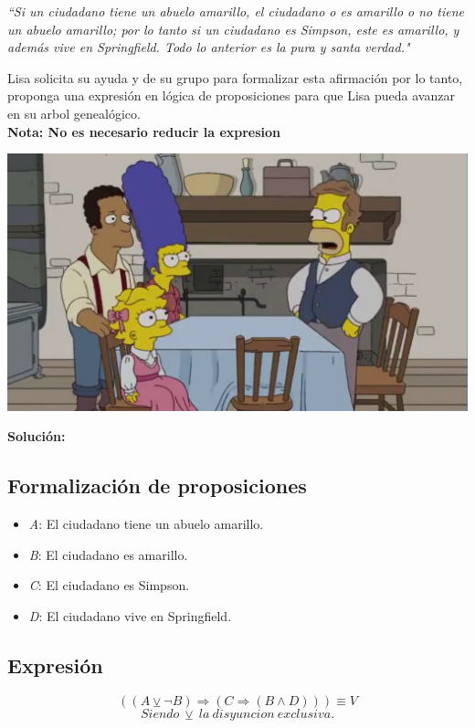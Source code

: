\documentclass[letterpaper,10pt]{article}
\begin{document}
\begin{center}
    \textit{``Si un ciudadano tiene un abuelo amarillo, el ciudadano o es amarillo o no tiene un abuelo amarillo; por lo tanto si un ciudadano es Simpson, este es amarillo, y además vive en Springfield. Todo lo anterior es la pura y santa verdad." }
   
\end{center}

Lisa solicita su ayuda y de su grupo para formalizar esta afirmación por lo tanto, proponga una expresión en lógica de proposiciones para que Lisa pueda avanzar en su arbol genealógico.\\
\textbf{Nota: No es necesario reducir la expresion}


\begin{center}
    \includegraphics[scale=0.3]{yellow3.PNG}
\end{center}

\textbf{Solución:}
\subsection{Formalizaci\'on de proposiciones}
\begin{minipage}[t]{0.6\textwidth}
\begin{itemize}
    \item \textit{A}: El ciudadano tiene un abuelo amarillo.
    \item \textit{B}: El ciudadano es amarillo.
    \item \textit{C}: El ciudadano es Simpson.
    \item \textit{D}: El ciudadano vive en Springfield.
\end{itemize}
\end{minipage}
\subsection{Expresi\'on}
\begin{minipage}[t]{0.4\textwidth}
\begin{equation*}
    ((A \veebar \neg B) \Rightarrow (C \Rightarrow (B \wedge D))) \equiv V
\end{equation*}
\begin{equation*}
    Siendo \  \veebar \ la \  disyuncion \   exclusiva.
\end{equation*}

\end{minipage}
\end{document}
